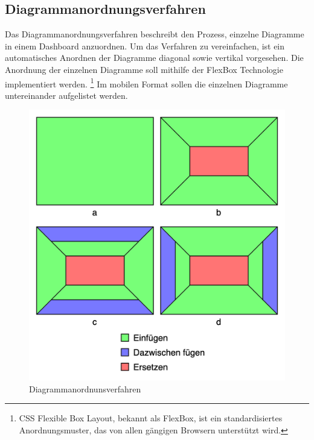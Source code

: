 \subsection{Diagrammanordnungsverfahren}
\label{subsec:diagrammanordnungsverfahren}
Das Diagrammanordnungsverfahren beschreibt den Prozess, einzelne Diagramme in einem Dashboard anzuordnen.
Um das Verfahren zu vereinfachen, ist ein automatisches Anordnen der Diagramme diagonal sowie vertikal vorgesehen.
Die Anordnung der einzelnen Diagramme soll mithilfe der FlexBox Technologie implementiert werden.
\footnote{CSS Flexible Box Layout, bekannt als FlexBox, ist ein standardisiertes Anordnungsmuster, das von allen gängigen Browsern unterstützt wird.\cite{CanIUseFlexBox}}
Im mobilen Format sollen die einzelnen Diagramme untereinander aufgelistet werden. 

\begin{figure}
    \begin{center}
    \includegraphics[scale=0.2]{img/abbildungen/DiagrammanordnungsverfahrenMitLegende}
    \end{center}
    \caption{Diagrammanordnunsverfahren}
    \label{figure:diagrammanordnungabbildung}
\end{figure}

